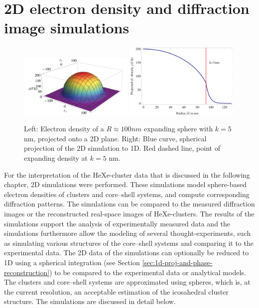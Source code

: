 \section{2D electron density and diffraction image simulations}\label{sec:2d-simulations}
\begin{figure}
	\centering
		\includegraphics[width=0.49\textwidth]{images/cluster-generation-2D.jpg}
		\includegraphics[width=0.49\textwidth]{images/cluster-generation-1D.png}
	\caption[Used electron densities in 2D real and Fourier space simulations.]{Left: Electron density of a $R\approx 100nm$ expanding sphere with $k=5$ nm, projected onto a 2D plane. Right: Blue curve, spherical projection of the 2D simulation to 1D. Red dashed line, point of expanding density at $k=5$ nm.}
	\label{fig:cluster-generation}
\end{figure}
For the interpretation of the HeXe-cluster data that is discussed in the following chapter, 2D simulations were performed. These simulations model sphere-based electron densities of clusters and core--shell systems, and compute corresponding diffraction patterns. The simulations can be compared to the measured diffraction images or the reconstructed real-space images of HeXe-clusters. The results of the simulations support the analysis of experimentally measured data and the simulations furthermore allow the modeling of several thought-experiments, such as simulating various structures of the core--shell systems and comparing it to the experimental data. The 2D data of the simulations can optionally be reduced to 1D using a spherical integration (see Section \ref{sec:1d-proj-and-phase-reconstruction}) to be compared to the experimental data or analytical models. The clusters and core--shell systems are approximated using spheres, which is, at the current resolution, an acceptable estimation of the icosahedral cluster structure. The simulations are discussed in detail below.\\[1\baselineskip]
